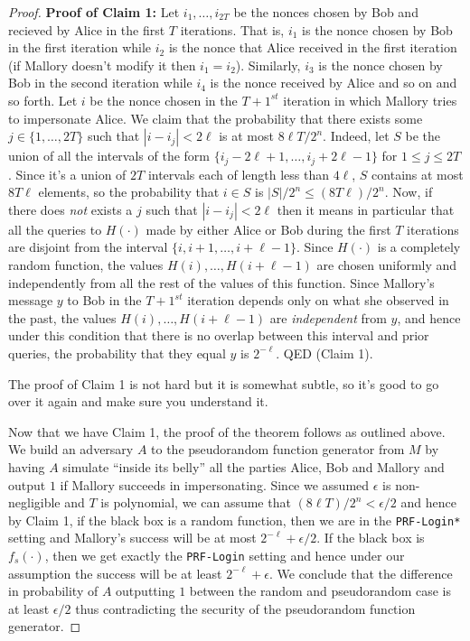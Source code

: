 \begin{proof}
\textbf{Proof of Claim 1:} Let \(i_1,\ldots,i_{2T}\) be the nonces
chosen by Bob and recieved by Alice in the first \(T\) iterations. That
is, \(i_1\) is the nonce chosen by Bob in the first iteration while
\(i_2\) is the nonce that Alice received in the first iteration (if
Mallory doesn't modify it then \(i_1=i_2\)). Similarly, \(i_3\) is the
nonce chosen by Bob in the second iteration while \(i_4\) is the nonce
received by Alice and so on and so forth. Let \(i\) be the nonce chosen
in the \(T+1^{st}\) iteration in which Mallory tries to impersonate
Alice. We claim that the probability that there exists some
\(j\in\{1,\ldots,2T\}\) such that \(|i-i_j|<2\ell\) is at most
\(8\ell T/2^n\). Indeed, let \(S\) be the union of all the intervals of
the form \(\{ i_j-2\ell+1,\ldots, i_j+2\ell-1 \}\) for
\(1 \leq j \leq 2T\). Since it's a union of \(2T\) intervals each of
length less than \(4\ell\), \(S\) contains at most \(8T\ell\) elements,
so the probability that \(i\in S\) is \(|S|/2^n \leq (8T\ell)/2^n\).
Now, if there does \emph{not} exists a \(j\) such that \(|i-i_j|<2\ell\)
then it means in particular that all the queries to \(H(\cdot)\) made by
either Alice or Bob during the first \(T\) iterations are disjoint from
the interval \(\{ i,i+1,\ldots,i+\ell-1 \}\). Since \(H(\cdot)\) is a
completely random function, the values \(H(i),\ldots,H(i+\ell-1)\) are
chosen uniformly and independently from all the rest of the values of
this function. Since Mallory's message \(y\) to Bob in the \(T+1^{st}\)
iteration depends only on what she observed in the past, the values
\(H(i),\ldots,H(i+\ell-1)\) are \emph{independent} from \(y\), and hence
under this condition that there is no overlap between this interval and
prior queries, the probability that they equal \(y\) is \(2^{-\ell}\).
QED (Claim 1).

The proof of Claim 1 is not hard but it is somewhat subtle, so it's good
to go over it again and make sure you understand it.

Now that we have Claim 1, the proof of the theorem follows as outlined
above. We build an adversary \(A\) to the pseudorandom function
generator from \(M\) by having \(A\) simulate ``inside its belly'' all
the parties Alice, Bob and Mallory and output \(1\) if Mallory succeeds
in impersonating. Since we assumed \(\epsilon\) is non-negligible and
\(T\) is polynomial, we can assume that \((8\ell T)/2^n < \epsilon/2\)
and hence by Claim 1, if the black box is a random function, then we are
in the \texttt{PRF-Login*} setting and Mallory's success will be at most
\(2^{-\ell}+\epsilon/2\). If the black box is \(f_s(\cdot)\), then we
get exactly the \texttt{PRF-Login} setting and hence under our
assumption the success will be at least \(2^{-\ell}+\epsilon\). We
conclude that the difference in probability of \(A\) outputting \(1\)
between the random and pseudorandom case is at least \(\epsilon/2\) thus
contradicting the security of the pseudorandom function generator.

\end{proof}

